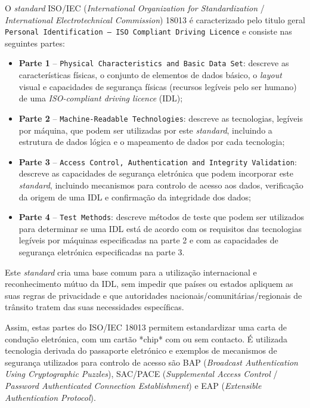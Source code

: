 
O \textit{standard} ISO/IEC (\textit{International Organization for Standardization} / \textit{International Electrotechnical Commission}) 18013 é caracterizado pelo titulo geral \texttt{Personal Identification — ISO
Compliant Driving Licence} e consiste nas seguintes partes:

\begin{itemize}
	\item \textbf{Parte 1} -- \texttt{Physical Characteristics and Basic Data Set}: descreve as características físicas, o conjunto de elementos de dados básico, o \textit{layout} visual e capacidades de segurança físicas (recursos legíveis pelo ser humano) de uma \textit{ISO-compliant driving licence} (IDL);
	\item \textbf{Parte 2} -- \texttt{Machine-Readable Technologies}: descreve as tecnologias, legíveis por máquina, que podem ser utilizadas por este \textit{standard}, incluindo a estrutura de dados lógica e o mapeamento de dados por cada tecnologia;
	\item \textbf{Parte 3} -- \texttt{Access Control, Authentication and Integrity Validation}: descreve as capacidades de segurança eletrónica que podem incorporar este \textit{standard}, incluindo mecanismos para controlo de acesso aos dados, verificação da origem de uma IDL e confirmação da integridade dos dados;
	\item \textbf{Parte 4} -- \texttt{Test Methods}: descreve métodos de teste que podem ser utilizados para determinar se uma IDL está de acordo com os requisitos das tecnologias legíveis por máquinas especificadas na parte 2 e com as capacidades de segurança eletrónica especificadas na parte 3.
\end{itemize}

Este \textit{standard} cria uma base comum para a utilização internacional e reconhecimento mútuo da IDL, sem impedir que países ou estados apliquem as suas regras de privacidade e que autoridades nacionais/comunitárias/regionais de trânsito tratem das suas necessidades específicas.

Assim, estas partes do ISO/IEC 18013 permitem estandardizar uma carta de condução eletrónica, com um cartão *chip* com ou sem contacto. É utilizada tecnologia derivada do passaporte eletrónico e exemplos de mecanismos de segurança utilizados para controlo de acesso são BAP (\textit{Broadcast Authentication Using Cryptographic Puzzles}), SAC/PACE (\textit{Supplemental Access Control} / \textit{Password Authenticated Connection Establishment}) e EAP (\textit{Extensible Authentication Protocol}).

